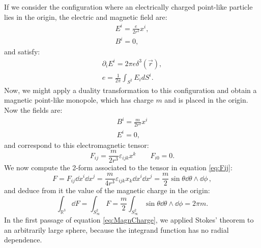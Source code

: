 \documentclass[main.tex]{subfiles}
\begin{document}
%
If we consider the configuration where an electrically charged point-like particle lies in the origin, the electric and magnetic field are:
\begin{subequations}\label{ElectricMonopole}
\begin{gather}
E^i=\frac{e}{2r^2}x^i,\\
B^i =0,
\end{gather}
\end{subequations}
%
and satisfy:
%
\begin{subequations}
\begin{align}
\partial_i E^i=2\pi e \delta^3(\vec r),\\
e=\frac{1}{2\pi}\int_{S^2} E_i d S^i.
\end{align}
\end{subequations}
%
Now, we might apply a duality transformation to this configuration and obtain a magnetic point-like monopole, which has charge $m$ and is placed in the origin. Now the fields are:
%
\begin{subequations}
\begin{gather}
\label{MagneticMonopole}
B^i=\frac{m}{2r^2}x^i\\
E^i=0,
\end{gather}
\end{subequations}
%
and correspond to this electromagnetic tensor:
\begin{equation}\label{eq:Fij}
F_{ij}=\frac{m}{2r^3}\varepsilon_{ijk}x^k \qquad F_{i0}=0.
\end{equation}
%
We now compute the 2-form associated to the tensor in equation \ref{eq:Fij}:
%
\begin{equation}
F=F_{ij}\dd{x^i}\dd{x^j}=\frac{m}{4r^3}\varepsilon_{ijk}x_k\dd{x^i}\dd{x^j}=\frac{m}{2}\sin\theta \dd{\theta}\wedge \dd{\phi}\,,
\end{equation}
%
and deduce from it the value of the magnetic charge in the origin:
%
\begin{equation} \label{eq:MagnCharge}
\int_{\mathbb R^3} \dd{F} = \int_{S^2_\infty} F=\frac{m}{2}\int_{S^2_\infty}\sin\theta \dd{\theta}\wedge \dd{\phi}=2\pi m .
\end{equation}
%
In the first passage of equation \ref{eq:MagnCharge}, we applied Stokes' theorem to an arbitrarily large sphere, because the integrand function has no radial dependence.
\end{document}
